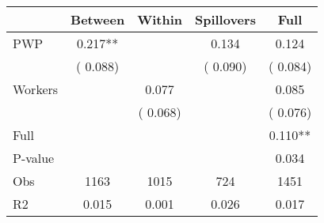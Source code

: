 
\begin{tabular}{l*{4}{c}}\hline&\multicolumn{1}{c}{Between}&\multicolumn{1}{c}{Within}&\multicolumn{1}{c}{Spillovers}&\multicolumn{1}{c}{Full}\\ \hline
 PWP           &              0.217**      &                                               &        0.134 &         0.124                            \\ 
                               &        (       0.088)           &                                       &       (       0.090)     &      (       0.084)                                           \\ 
 Workers       &                                               &        0.077    &                                &             0.085                            \\ 
                               &                                               & (       0.068)                  &                                        &      (       0.076)                                           \\ 
\hline                                                                                                                                                                                                                                            
 Full                  &                                               &                                               &                                        &             0.110**                                     \\ 
 P-value               &                                               &                                               &                                        &             0.034                                           \\ 
 Obs                   &               1163               &       1015                       &       724                &              1451                                               \\ 
 R2                    &                      0.015              &              0.001                      &              0.026               &                     0.017                                              \\ 
\hline \end{tabular}                                                                                                                                                                                                              